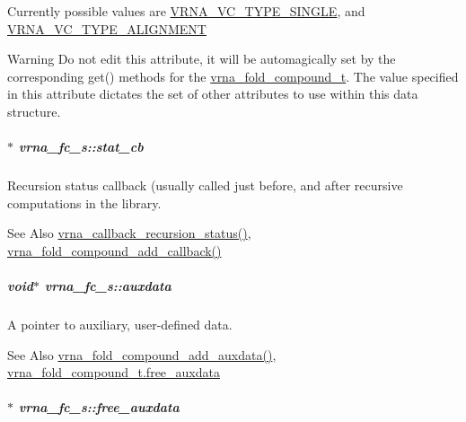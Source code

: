 Currently possible values are \hyperlink{group__fold__compound_gga01a4ff86fa71deaaa5d1abbd95a1447da1608d3aa78905fc39e0d25a624ac9512}{V\-R\-N\-A\-\_\-\-V\-C\-\_\-\-T\-Y\-P\-E\-\_\-\-S\-I\-N\-G\-L\-E}, and \hyperlink{group__fold__compound_gga01a4ff86fa71deaaa5d1abbd95a1447da056345f1bcfe7cd595d1fd437c05246d}{V\-R\-N\-A\-\_\-\-V\-C\-\_\-\-T\-Y\-P\-E\-\_\-\-A\-L\-I\-G\-N\-M\-E\-N\-T} \begin{DoxyWarning}{Warning}
Do not edit this attribute, it will be automagically set by the corresponding get() methods for the \hyperlink{group__fold__compound_ga1b0cef17fd40466cef5968eaeeff6166}{vrna\-\_\-fold\-\_\-compound\-\_\-t}. The value specified in this attribute dictates the set of other attributes to use within this data structure. 
\end{DoxyWarning}
\hypertarget{group__fold__compound_a87a83f6795b569000efcbe65acc3dd81}{
\subparagraph[{stat\-\_\-cb}]{$\ast$ vrna\-\_\-fc\-\_\-s\-::stat\-\_\-cb}}\label{group__fold__compound_a87a83f6795b569000efcbe65acc3dd81}


Recursion status callback (usually called just before, and after recursive computations in the library. 

\begin{DoxySeeAlso}{See Also}
\hyperlink{group__fold__compound_ga9fafb3f0217e27339bb9faf61a03e723}{vrna\-\_\-callback\-\_\-recursion\-\_\-status()}, \hyperlink{group__fold__compound_ga097ed6133055624667cbce8cfdebf82d}{vrna\-\_\-fold\-\_\-compound\-\_\-add\-\_\-callback()} 
\end{DoxySeeAlso}
\hypertarget{group__fold__compound_a20048e0c369e9f24b55423d600037c68}{
\subparagraph[{auxdata}]{\setlength{\rightskip}{0pt plus 5cm}void$\ast$ vrna\-\_\-fc\-\_\-s\-::auxdata}}\label{group__fold__compound_a20048e0c369e9f24b55423d600037c68}


A pointer to auxiliary, user-\/defined data. 

\begin{DoxySeeAlso}{See Also}
\hyperlink{group__fold__compound_ga6316a9426bea2f742375e8df6febd3f6}{vrna\-\_\-fold\-\_\-compound\-\_\-add\-\_\-auxdata()}, \hyperlink{group__fold__compound_a8e84dbabab016ecd74da6c38cb94e816}{vrna\-\_\-fold\-\_\-compound\-\_\-t.\-free\-\_\-auxdata} 
\end{DoxySeeAlso}
\hypertarget{group__fold__compound_a8e84dbabab016ecd74da6c38cb94e816}{
\subparagraph[{free\-\_\-auxdata}]{$\ast$ vrna\-\_\-fc\-\_\-s\-::free\-\_\-auxdata}}\label{group__fold__compound_a8e84dbabab016ecd74da6c38cb94e816}


